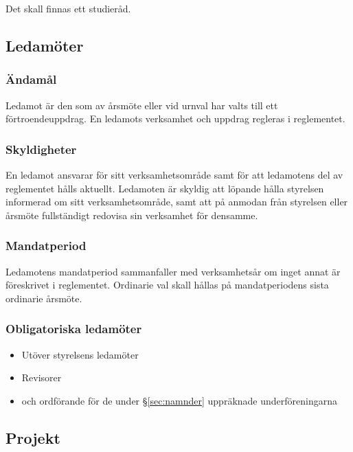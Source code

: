 \documentclass{dgovdoc}
\begin{document}
Det skall finnas ett studieråd.

\subsection{Ledamöter}

\subsubsection{Ändamål}

Ledamot är den som av årsmöte eller vid urnval har valts till ett
förtroendeuppdrag. En ledamots verksamhet och uppdrag regleras i
reglementet.

\subsubsection{Skyldigheter}

En ledamot ansvarar för sitt verksamhetsområde samt för att ledamotens del
av reglementet hålls aktuellt. Ledamoten är skyldig att löpande hålla
styrelsen informerad om sitt verksamhetsområde, samt att på anmodan från
styrelsen eller årsmöte fullständigt redovisa sin verksamhet för densamme.

\subsubsection{Mandatperiod}

Ledamotens mandatperiod sammanfaller med verksamhetsår om inget annat är
föreskrivet i reglementet. Ordinarie val skall hållas på mandatperiodens sista
ordinarie årsmöte.

\subsubsection{Obligatoriska ledamöter}

\begin{itemize}

  \item Utöver styrelsens ledamöter 
  \item Revisorer 
  \item och ordförande för de under \S\ref{sec:namnder} uppräknade underföreningarna

\end{itemize}

\subsection{Projekt}
\end{document}
